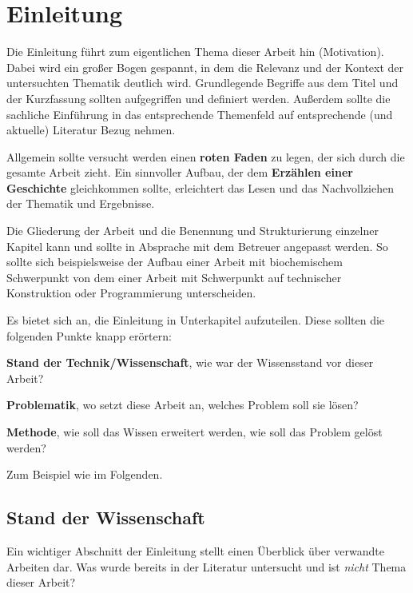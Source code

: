 
\chapter{Einleitung}
\label{chapter:einleitung}

Die Einleitung führt zum eigentlichen Thema dieser Arbeit hin (Motivation). Dabei wird ein großer Bogen gespannt, in dem die Relevanz und der Kontext der untersuchten Thematik deutlich wird. Grundlegende Begriffe aus dem Titel und der Kurzfassung sollten aufgegriffen und definiert werden. Außerdem sollte die sachliche Einführung in das entsprechende Themenfeld auf entsprechende (und aktuelle) Literatur Bezug nehmen.

Allgemein sollte versucht werden einen \textbf{roten Faden} zu legen, der sich durch die gesamte Arbeit zieht. Ein sinnvoller Aufbau, der dem \textbf{Erzählen einer Geschichte} gleichkommen sollte, erleichtert das Lesen und das Nachvollziehen der Thematik und Ergebnisse.

Die Gliederung der Arbeit und die Benennung und Strukturierung einzelner Kapitel kann und sollte in Absprache mit dem Betreuer angepasst werden. So sollte sich beispielsweise der Aufbau einer Arbeit mit biochemischem Schwerpunkt von dem einer Arbeit mit Schwerpunkt auf technischer Konstruktion oder Programmierung unterscheiden.

Es bietet sich an, die Einleitung in Unterkapitel aufzuteilen. Diese sollten die folgenden Punkte knapp erörtern:

\begin{description}
	\item \textbf{Stand der Technik/Wissenschaft}, wie war der Wissensstand vor dieser Arbeit?
	\item \textbf{Problematik}, wo setzt diese Arbeit an, welches Problem soll sie lösen?
	\item \textbf{Methode}, wie soll das Wissen erweitert werden, wie soll das Problem gelöst werden?
\end{description}

Zum Beispiel wie im Folgenden.

\section{Stand der Wissenschaft}

Ein wichtiger Abschnitt der Einleitung stellt einen Überblick über verwandte Arbeiten dar. Was wurde bereits in der Literatur untersucht und ist \emph{nicht} Thema dieser Arbeit?

